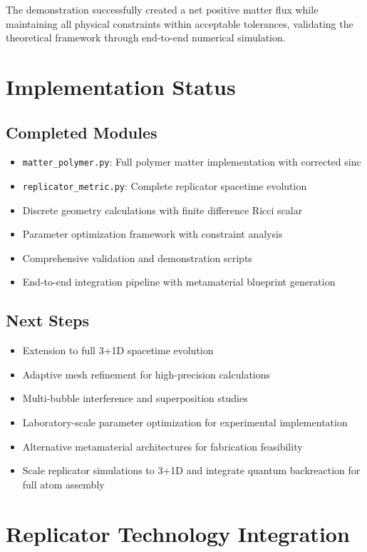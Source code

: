 \documentclass[11pt]{article}
\begin{document}
The demonstration successfully created a net positive matter flux while maintaining all physical constraints within acceptable tolerances, validating the theoretical framework through end-to-end numerical simulation.

\section{Implementation Status}

\subsection{Completed Modules}
\begin{itemize}
\item \texttt{matter\_polymer.py}: Full polymer matter implementation with corrected sinc
\item \texttt{replicator\_metric.py}: Complete replicator spacetime evolution
\item Discrete geometry calculations with finite difference Ricci scalar
\item Parameter optimization framework with constraint analysis
\item Comprehensive validation and demonstration scripts
\item End-to-end integration pipeline with metamaterial blueprint generation
\end{itemize}

\subsection{Next Steps}
\begin{itemize}
\item Extension to full 3+1D spacetime evolution
\item Adaptive mesh refinement for high-precision calculations
\item Multi-bubble interference and superposition studies
\item Laboratory-scale parameter optimization for experimental implementation
\item Alternative metamaterial architectures for fabrication feasibility
\item Scale replicator simulations to 3+1D and integrate quantum backreaction for full atom assembly
\end{itemize}

\section{Replicator Technology Integration}
\end{document}
